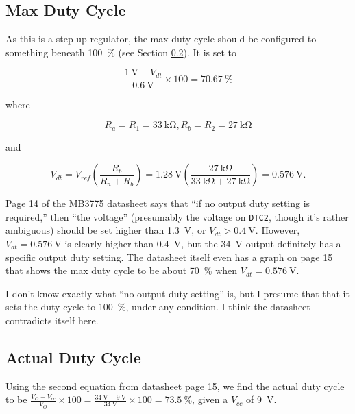 \documentclass{article}
\newcommand{\Vcc}{$V_{cc}$}
\newcommand{\chippin}{\texttt}
\newcommand{\model}{\textsf}
\begin{document}
\subsection{Max Duty Cycle}
As this is a step-up regulator, the max duty cycle should be
configured to something beneath \qty{100}{\%} (see Section
\ref{sec:34v_actual_duty_cycle}). It is set to

\begin{displaymath}
  \frac{\qty{1}{\volt} - V_{dt}}{\qty{0.6}{\volt}} \times{} 100 = \qty{70.67}{\%}
\end{displaymath}

\noindent
where

\begin{displaymath}
  R_a = R_1 = \qty{33}{\kilo\ohm},R_b = R_2 = \qty{27}{\kilo\ohm}
\end{displaymath}

\noindent
and

\begin{displaymath}
  V_{dt} =  V_{ref}\left(\frac{R_b}{R_a+R_b}\right) =
  \qty{1.28}{\volt}\left(\frac{\qty{27}{\kilo\ohm}}{\qty{33}{\kilo\ohm} +
      \qty{27}{\kilo\ohm}}\right) = \qty{0.576}{\volt}.
\end{displaymath}

Page 14 of the \model{MB3775} datasheet says that ``if no output duty
setting is required,'' then ``the voltage'' (presumably the voltage on
\chippin{DTC2}, though it's rather ambiguous) should be set higher
than \qty{1.3}{\volt}, or $V_{dt} > \qty{0.4}{\volt}$. However,
$V_{dt} = \qty{0.576}{\volt}$ is clearly higher than \qty{0.4}{\volt},
but the \qty{34}{\volt} output definitely has a specific output duty
setting. The datasheet itself even has a graph on page 15 that shows
the max duty cycle to be about \qty{70}{\%} when
$V_{dt} = \qty{0.576}{\volt}$.

I don't know exactly what ``no output duty setting'' is, but I presume
that that it sets the duty cycle to \qty{100}{\%}, under any
condition. I think the datasheet contradicts itself here.

\subsection{Actual Duty Cycle}
\label{sec:34v_actual_duty_cycle}
Using the second equation from datasheet page 15, we find the actual
duty cycle to be
$\frac{V_O - V_{cc}}{V_O} \times{} 100 = \frac{\qty{34}{\volt} -
  \qty{9}{\volt}}{\qty{34}{\volt}} \times{} 100 = \qty{73.5}{\%}$,
given a \Vcc{} of \qty{9}{\volt}.
\end{document}
